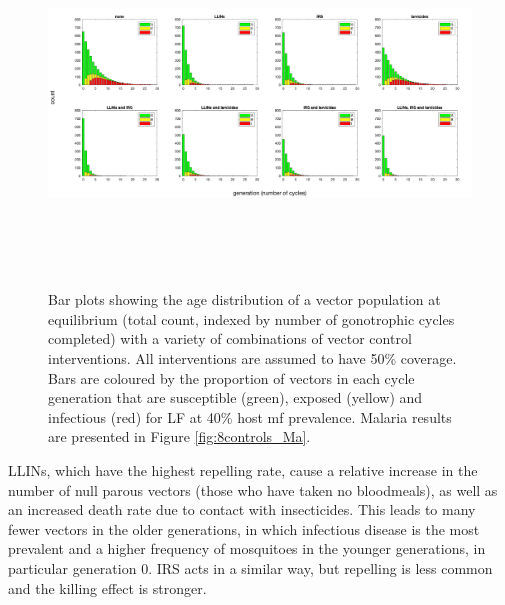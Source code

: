 \begin{figure} 
\includegraphics[height=9.7cm]{Project/Figures/VectorModel/LF/populationhist_8controls.png}
\caption{Bar plots showing the age distribution of a vector population at equilibrium (total count, indexed by number of gonotrophic cycles completed) with a variety of combinations of vector control interventions. All interventions are assumed to have 50\% coverage. Bars are coloured by the proportion of vectors in each cycle generation that are susceptible (green), exposed (yellow) and infectious (red) for LF at 40\% host mf prevalence. Malaria results are presented in Figure \ref{fig:8controls_Ma}.}
\label{fig:8controls_LF}
\end{figure} 

LLINs, which have the highest repelling rate, cause a relative increase in the number of null parous vectors (those who have taken no bloodmeals), as well as an increased death rate due to contact with insecticides. This leads to many fewer vectors in the older generations, in which infectious disease is the most prevalent and a higher frequency of mosquitoes in the younger generations, in particular generation $0$. IRS acts in a similar way, but repelling is less common and the killing effect is stronger. 

